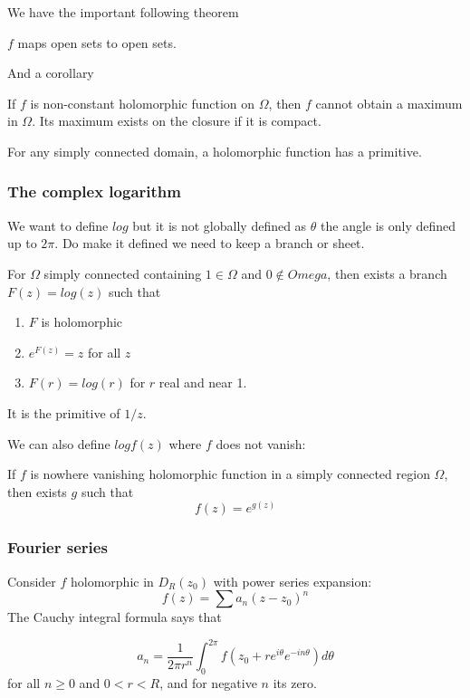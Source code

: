 \documentclass[main.tex]{subfiles}
\begin{document}
We have the important following theorem 
\begin{theorem}
$f$ maps open sets to open sets.
\end{theorem}

And a corollary 
\begin{corollary}
If $f$ is non-constant holomorphic function on $\Omega$, then $f$ cannot obtain a maximum in $\Omega$. Its maximum exists on the closure if it is compact.
\end{corollary}

For any simply connected domain, a holomorphic function has a primitive. 

\subsubsection{The complex logarithm}
We want to define $log$ but it is not globally defined as $\theta$ the angle is only defined up to $2\pi$. Do make it defined we need to keep a branch or sheet.

\begin{theorem}
For $\Omega$ simply connected containing $1 \in \Omega$ and $0 \nin Omega$, then exists a branch $F(z) = log(z)$ such that
\begin{enumerate}
    \item $F$ is holomorphic
    \item $e^{F(z)} = z$ for all $z$
    \item $F(r) = log(r)$ for $r$ real and near 1.
\end{enumerate}
\end{theorem}
It is the primitive of $1/z$.

We can also define $log f(z)$ where $f$ does not vanish:

\begin{theorem}
If $f$ is nowhere vanishing holomorphic function in a simply connected region $\Omega$, then exists $g$ such that 
$$
f(z) = e^{g(z)}
$$
\end{theorem}

\subsubsection{Fourier series}
Consider $f$ holomorphic in $D_R(z_0)$ with power series expansion:
$$
f(z) = \sum a_n(z-z_0)^n
$$
The Cauchy integral formula says that
\begin{theorem}
$$
a_n = \frac{1}{2\pi r^n} \int_0 ^{2\pi} f(z_0 + r e^{i\theta} e^{-in\theta}) d\theta
$$
for all $n \geq 0$ and $0 < r < R$, and for negative $n$ its zero. 
\end{theorem}
\end{document}
